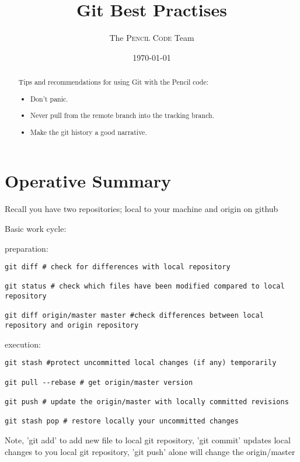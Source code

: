 \documentclass[12pt,pdftex]{article}
\author{The \textsc{Pencil Code} Team}
\date{\today}
\title{Git Best Practises}
\begin{document}
\lstset{frame=single,basicstyle=\ttfamily\footnotesize,language=sh,label= ,caption= ,captionpos=b,numbers=none}

\maketitle
\tableofcontents

\thispagestyle{empty}

\begin{abstract}
\noindent%
Tips and recommendations for using Git with the Pencil code:
\begin{itemize}
\item Don't panic.
\item Never pull from the remote branch into the tracking branch.
\item Make the git history a good narrative.
\end{itemize}
\end{abstract}


\section{Operative Summary}
\label{sec-1}

Recall you have two repositories; local to your machine and origin on github

Basic work cycle:

preparation:

\begin{lstlisting}
git diff # check for differences with local repository

git status # check which files have been modified compared to local repository

git diff origin/master master #check differences between local repository and origin repository
\end{lstlisting}

execution:

\begin{lstlisting}
git stash #protect uncommitted local changes (if any) temporarily

git pull --rebase # get origin/master version

git push # update the origin/master with locally committed revisions

git stash pop # restore locally your uncommitted changes
\end{lstlisting}

Note, 'git add' to add new file to local git repository, 'git commit'
updates local changes to you local git repository, 'git push' alone will
change the origin/master
\end{document}
